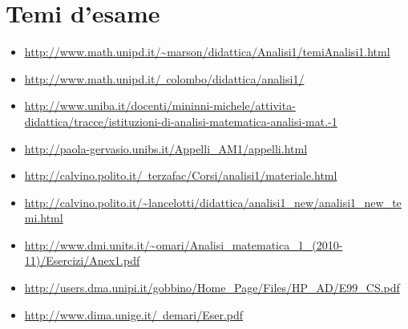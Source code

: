 \documentclass[a4paper,10pt]{article}
\begin{document}
\section{Temi d'esame}
\begin{itemize}
 \item \url{http://www.math.unipd.it/~marson/didattica/Analisi1/temiAnalisi1.html}
 \item \href{http://www.math.unipd.it/~colombo/didattica/analisi1/}{http://www.math.unipd.it/~colombo/didattica/analisi1/}
 \item \url{http://www.uniba.it/docenti/mininni-michele/attivita-didattica/tracce/istituzioni-di-analisi-matematica-analisi-mat.-1}
 \item \url{http://paola-gervasio.unibs.it/Appelli_AM1/appelli.html}
 \item \href{http://calvino.polito.it/~terzafac/Corsi/analisi1/materiale.html}{http://calvino.polito.it/~terzafac/Corsi/analisi1/materiale.html}
 \item \url{http://calvino.polito.it/~lancelotti/didattica/analisi1_new/analisi1_new_temi.html}
 \item \url{http://www.dmi.units.it/~omari/Analisi_matematica_1_(2010-11)/Esercizi/Anex1.pdf}
 \item \url{http://users.dma.unipi.it/gobbino/Home_Page/Files/HP_AD/E99_CS.pdf}
 \item \href{http://www.dima.unige.it/~demari/Eser.pdf}{http://www.dima.unige.it/~demari/Eser.pdf}
\end{itemize}
\end{document}
